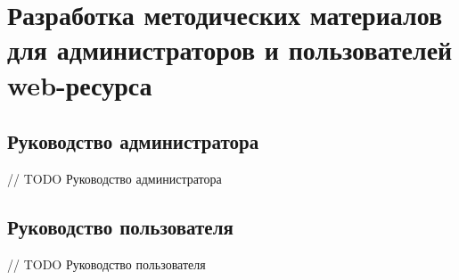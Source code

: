 \section{Разработка методических материалов для администраторов и пользователей web-ресурса}
    \subsection{Руководство администратора}
    // TODO Руководство администратора

    \subsection{Руководство пользователя}
    // TODO Руководство пользователя

\clearpage
